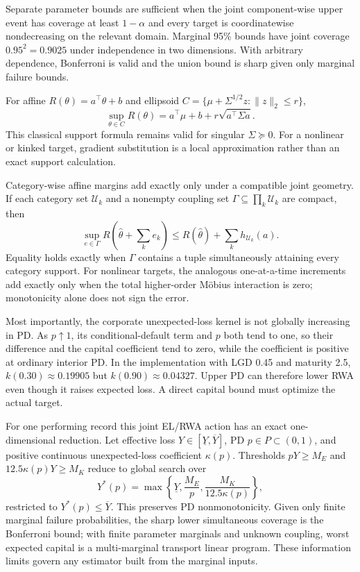 \documentclass[a4paper,10pt]{article}
\begin{document}
Separate parameter bounds are sufficient when the joint component-wise upper event has coverage at least $1-\alpha$ and every target is coordinatewise nondecreasing on the relevant domain. Marginal 95\% bounds have joint coverage $0.95^2=0.9025$ under independence in two dimensions. With arbitrary dependence, Bonferroni is valid and the union bound is sharp given only marginal failure bounds.

For affine $R(\theta)=a^\top\theta+b$ and ellipsoid $C=\{\mu+\Sigma^{1/2}z:\|z\|_2\le r\}$,
\[
\sup_{\theta\in C}R(\theta)=a^\top\mu+b+r\sqrt{a^\top\Sigma a}. \tag{9}
\]
This classical support formula remains valid for singular
$\Sigma\succeq0$.  For a nonlinear or kinked target, gradient substitution is
a local approximation rather than an exact support calculation.

Category-wise affine margins add exactly only under a compatible joint geometry. If each category set $\mathcal U_k$ and a nonempty coupling set $\Gamma\subseteq\prod_k\mathcal U_k$ are compact, then
\[
\sup_{e\in\Gamma}R\!\left(\hat\theta+\sum_k e_k\right)
\le R(\hat\theta)+\sum_k h_{\mathcal U_k}(a). \tag{10}
\]
Equality holds exactly when $\Gamma$ contains a tuple simultaneously attaining every category support. For nonlinear targets, the analogous one-at-a-time increments add exactly only when the total higher-order M\"obius interaction is zero; monotonicity alone does not sign the error.

Most importantly, the corporate unexpected-loss kernel is not globally increasing in PD. As $p\uparrow1$, its conditional-default term and $p$ both tend to one, so their difference and the capital coefficient tend to zero, while the coefficient is positive at ordinary interior PD. In the implementation with LGD 0.45 and maturity 2.5, $k(0.30)\approx0.19905$ but $k(0.90)\approx0.04327$. Upper PD can therefore lower RWA even though it raises expected loss. A direct capital bound must optimize the actual target.

For one performing record this joint EL/RWA action has an exact one-dimensional reduction. Let effective loss $Y\in[\underline Y,\overline Y]$, PD $p\in P\subset(0,1)$, and positive continuous unexpected-loss coefficient $\kappa(p)$. Thresholds $pY\ge M_E$ and $12.5\kappa(p)Y\ge M_K$ reduce to global search over
\[
Y^*(p)=\max\left\{\underline Y,\frac{M_E}{p},\frac{M_K}{12.5\kappa(p)}\right\}, \tag{11}
\]
restricted to $Y^*(p)\le\overline Y$. This preserves PD nonmonotonicity. Given
only finite marginal failure probabilities, the sharp lower simultaneous
coverage is the Bonferroni bound; with finite parameter marginals and unknown
coupling, worst expected capital is a multi-marginal transport linear program.
These information limits govern any estimator built from the marginal inputs.
\end{document}
